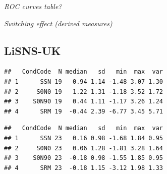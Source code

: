 \documentclass[a4paper, twoside]{templates/ociamthesis}
\begin{document}
\colorbox[HTML]{CCCCFF}{\emph{ROC curves table?}}

\colorbox[HTML]{CCCCFF}{\emph{Switching effect (derived measures)}}

\hypertarget{lisns-uk}{%
\subsection{LiSNS-UK}\label{lisns-uk}}

\begin{table}

\caption{\label{tab:LiSNS-ztab}LiSNS-UK standard residuals (z-scores) descriptives by group. abnormal: the percentage of abnormal score, defined as: z-score > 1.96 (SSN, S0N0, \& S0N90) and  z-score < 1.96 (SRM). Percentage in brackets were accounted for observations that were trimmed in the z-score calculation procedure.}
\centering
{}
\end{table}

\begin{verbatim}
##   CondCode  N median   sd   min  max  var
## 1      SSN 19   0.94 1.14 -1.48 3.07 1.30
## 2     S0N0 19   1.22 1.31 -1.18 3.52 1.72
## 3    S0N90 19   0.44 1.11 -1.17 3.26 1.24
## 4      SRM 19  -0.44 2.39 -6.77 3.45 5.71
\end{verbatim}

\begin{verbatim}
##   CondCode  N median   sd   min  max  var
## 1      SSN 23   0.16 0.98 -1.68 1.84 0.95
## 2     S0N0 23   0.06 1.28 -1.81 3.28 1.64
## 3    S0N90 23  -0.18 0.98 -1.55 1.85 0.95
## 4      SRM 23  -0.18 1.15 -3.12 1.98 1.33
\end{verbatim}
\end{document}
